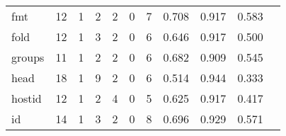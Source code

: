 \begin{longtable}{lp{1.2cm}p{1.2cm}p{1.2cm}p{1.2cm}p{1.2cm}p{1.2cm}p{1.2cm}p{1.2cm}p{1.2cm}p{1.2cm}}
fmt       &                                    12 &                                                  1 &                                                  2 &                                                  2 &                                                  0 &                                                  7 &                                         0.708 &                                              0.917 &                                              0.583 \\
fold      &                                    12 &                                                  1 &                                                  3 &                                                  2 &                                                  0 &                                                  6 &                                         0.646 &                                              0.917 &                                              0.500 \\
groups    &                                    11 &                                                  1 &                                                  2 &                                                  2 &                                                  0 &                                                  6 &                                         0.682 &                                              0.909 &                                              0.545 \\
head      &                                    18 &                                                  1 &                                                  9 &                                                  2 &                                                  0 &                                                  6 &                                         0.514 &                                              0.944 &                                              0.333 \\
hostid    &                                    12 &                                                  1 &                                                  2 &                                                  4 &                                                  0 &                                                  5 &                                         0.625 &                                              0.917 &                                              0.417 \\
id        &                                    14 &                                                  1 &                                                  3 &                                                  2 &                                                  0 &                                                  8 &                                         0.696 &                                              0.929 &                                              0.571 \\

\end{longtable}
